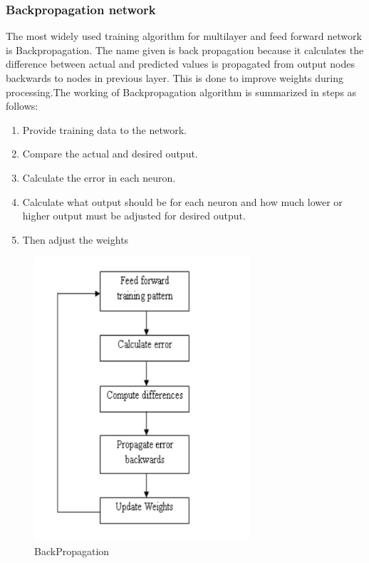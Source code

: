 \documentclass[oneside,12pt]{Classes/VTU}
\begin{document}
  	\subsubsection{Backpropagation network}
  	The most widely used training algorithm for multilayer and feed forward network is
  	Backpropagation. The name given is back propagation because it calculates the difference between actual and predicted values is propagated from output nodes backwards to nodes in previous layer. This is done to improve weights during processing.The working of Backpropagation algorithm is summarized in steps as follows:
  	\begin{enumerate}
  		\item Provide training data to the network.
  		\item Compare the actual and desired output.
  		\item Calculate the error in each neuron. 
  		\item Calculate what output should be for each neuron and how much lower or
  		higher output must be adjusted for desired output.
  		\item Then adjust the weights
  	\end{enumerate}
  
  \begin{figure}
  	\begin{center}
  			\includegraphics[width=8cm]{images/backpropogation.png}
  			\caption{BackPropagation}
  	\end{center}
  \end{figure}
\end{document}
